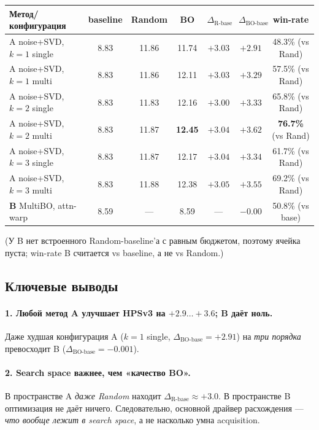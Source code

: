 \documentclass[11pt,a4paper]{article}
\begin{document}
\begin{center}
\renewcommand{\arraystretch}{1.2}
\footnotesize
\begin{tabular}{lcccccc}
\toprule
\textbf{Метод/конфигурация} & baseline & Random & BO & $\Delta_\text{R-base}$ & $\Delta_\text{BO-base}$ & win-rate \\
\midrule
A noise+SVD, $k=1$ single  & 8.83 & 11.86 & 11.74 & $+3.03$ & $+2.91$ & 48.3\% (vs Rand) \\
A noise+SVD, $k=1$ multi   & 8.83 & 11.86 & 12.11 & $+3.03$ & $+3.29$ & 57.5\% (vs Rand) \\
A noise+SVD, $k=2$ single  & 8.83 & 11.83 & 12.16 & $+3.00$ & $+3.33$ & 65.8\% (vs Rand) \\
A noise+SVD, $k=2$ multi   & 8.83 & 11.87 & \textbf{12.45} & $+3.04$ & $\bm{+3.62}$ & \textbf{76.7\%} (vs Rand) \\
A noise+SVD, $k=3$ single  & 8.83 & 11.87 & 12.17 & $+3.04$ & $+3.34$ & 61.7\% (vs Rand) \\
A noise+SVD, $k=3$ multi   & 8.83 & 11.88 & 12.38 & $+3.05$ & $+3.55$ & 69.2\% (vs Rand) \\
\midrule
\textbf{B} MultiBO, attn-warp & 8.59 & --- & 8.59 & --- & $\bm{-0.00}$ & 50.8\% (vs base) \\
\bottomrule
\end{tabular}
\end{center}

(У B нет встроенного Random-baseline'а с равным бюджетом, поэтому ячейка
пуста; win-rate B считается vs baseline, а не vs Random.)

\subsection{Ключевые выводы}

\paragraph{1. Любой метод A улучшает HPSv3 на $+2.9{\ldots}{+}3.6$; B даёт ноль.}
Даже худшая конфигурация A (\(k=1\) single, $\Delta_\text{BO-base}=+2.91$)
на \emph{три порядка} превосходит B ($\Delta_\text{BO-base}=-0.001$).

\paragraph{2. Search space важнее, чем «качество BO».}
В пространстве A \emph{даже Random} находит $\Delta_\text{R-base} \approx +3.0$.
В пространстве B оптимизация не даёт ничего. Следовательно, основной
драйвер расхождения --- \emph{что вообще лежит в search space}, а не
насколько умна acquisition.
\end{document}
